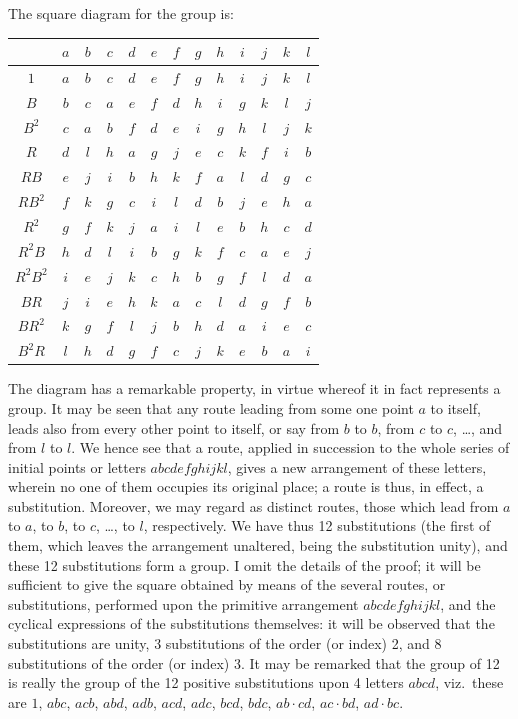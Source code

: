 \documentclass[11pt,a4paper]{book}
\begin{document}
The square diagram for the group is:
\begin{center}
\begin{tabular}{c|cccccccccccc}
& $a$ & $b$ & $c$ & $d$ & $e$ & $f$ & $g$ & $h$ & $i$ & $j$ & $k$ & $l$ \\
\hline
$1$ & $a$ & $b$ & $c$ & $d$ & $e$ & $f$ & $g$ & $h$ & $i$ & $j$ & $k$ & $l$ \\
$B$ & $b$ & $c$ & $a$ & $e$ & $f$ & $d$ & $h$ & $i$ & $g$ & $k$ & $l$ & $j$ \\
$B^2$ & $c$ & $a$ & $b$ & $f$ & $d$ & $e$ & $i$ & $g$ & $h$ & $l$ & $j$ & $k$ \\
$R$ & $d$ & $l$ & $h$ & $a$ & $g$ & $j$ & $e$ & $c$ & $k$ & $f$ & $i$ & $b$ \\
$RB$ & $e$ & $j$ & $i$ & $b$ & $h$ & $k$ & $f$ & $a$ & $l$ & $d$ & $g$ & $c$ \\
$RB^2$ & $f$ & $k$ & $g$ & $c$ & $i$ & $l$ & $d$ & $b$ & $j$ & $e$ & $h$ & $a$ \\
$R^2$ & $g$ & $f$ & $k$ & $j$ & $a$ & $i$ & $l$ & $e$ & $b$ & $h$ & $c$ & $d$ \\
$R^2B$ & $h$ & $d$ & $l$ & $i$ & $b$ & $g$ & $k$ & $f$ & $c$ & $a$ & $e$ & $j$ \\
$R^2B^2$ & $i$ & $e$ & $j$ & $k$ & $c$ & $h$ & $b$ & $g$ & $f$ & $l$ & $d$ & $a$ \\
$BR$ & $j$ & $i$ & $e$ & $h$ & $k$ & $a$ & $c$ & $l$ & $d$ & $g$ & $f$ & $b$ \\
$BR^2$ & $k$ & $g$ & $f$ & $l$ & $j$ & $b$ & $h$ & $d$ & $a$ & $i$ & $e$ & $c$ \\
$B^2R$ & $l$ & $h$ & $d$ & $g$ & $f$ & $c$ & $j$ & $k$ & $e$ & $b$ & $a$ & $i$
\end{tabular}
\end{center}

\clearpage
The diagram has a remarkable property, in virtue whereof it in fact represents a group. It may be seen that any route leading from some one point $a$ to itself, leads also from every other point to itself, or say from $b$ to $b$, from $c$ to $c$, \dots, and from $l$ to $l$. We hence see that a route, applied in succession to the whole series of initial points or letters $abcdefghijkl$, gives a new arrangement of these letters, wherein no one of them occupies its original place; a route is thus, in effect, a substitution. Moreover, we may regard as distinct routes, those which lead from $a$ to $a$, to $b$, to $c$, \dots, to $l$, respectively. We have thus 12 substitutions (the first of them, which leaves the arrangement unaltered, being the substitution unity), and these 12 substitutions form a group. I omit the details of the proof; it will be sufficient to give the square obtained by means of the several routes, or substitutions, performed upon the primitive arrangement $abcdefghijkl$, and the cyclical expressions of the substitutions themselves: it will be observed that the substitutions are unity, 3 substitutions of the order (or index) 2, and 8 substitutions of the order (or index) 3. It may be remarked that the group of 12 is really the group of the 12 positive substitutions upon 4 letters $abcd$, viz.\ these are $1$, $abc$, $acb$, $abd$, $adb$, $acd$, $adc$, $bcd$, $bdc$, $ab \cdot cd$, $ac \cdot bd$, $ad \cdot bc$.
\end{document}
